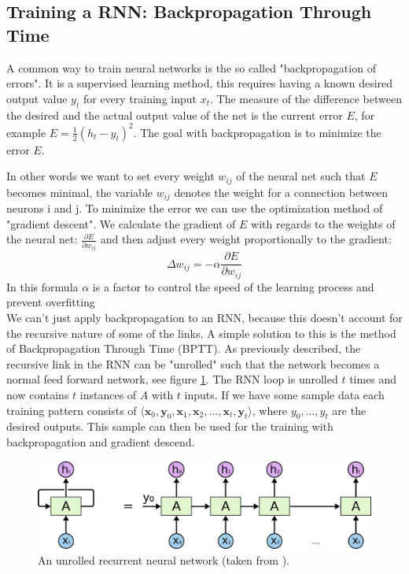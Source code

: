 \subsection{Training a RNN: Backpropagation Through Time}
\label{subsec:BPTT}

A common way to train neural networks is the so called "backpropagation of errors". It is a supervised learning method,
this requires having a known desired output value $y_t$ for every training input $x_t$. 
The measure of the difference between the desired and the 
actual output value of the net is the current error $E$, for example $E = \frac{1}{2} (h_t - y_t)^2$. 
The goal with backpropagation is to minimize the error $E$.

In other words we want to set every weight $w_{ij}$ of the neural net such that $E$ becomes minimal, 
the variable $w_{ij}$ denotes the weight for a connection between neurons i and j.
To minimize the error we can use the optimization method of "gradient descent". 
We calculate the gradient of $E$ with regards to the weights of the neural net: $\frac{\partial E}{\partial w_{ij}}$ and
then adjust every weight proportionally to the gradient:
\[
  \Delta w_{ij} = - \alpha \frac{\partial E}{\partial w_{ij}}
\]
In this formula $\alpha$ is a factor to control the speed of the learning process and prevent overfitting\\

We can't just apply backpropagation to an RNN, because this doesn't account for the recursive nature of some of the links. 
A simple solution to this is the method of Backpropagation Through Time (BPTT). As previously described, the recursive 
link in the RNN can be "unrolled" such that the network becomes a normal feed forward network, see figure \ref{fig:RNN-unrolled}. 
The RNN loop is unrolled $t$ times and now contains $t$ instances of $A$ with $t$ inputs. 
If we have some sample data each training pattern consists of
$\langle\mathbf{x}_0,\mathbf{y}_0,\mathbf{x}_{1},\mathbf{x}_{2},\dots,\mathbf{x}_{t},\mathbf{y}_{t}\rangle$, 
where ${y_0,\dots,y_t}$ are the desired outputs.
This sample can then be used for the training with backpropagation and gradient descend.

\begin{figure}[H]
\begin{center}
  \includegraphics[width=\textwidth]{./img/RNN-unrolled}
  \caption{An unrolled recurrent neural network (taken from \cite{olah:lstm:2015}).}
  \label{fig:RNN-unrolled}
\end{center}
\end{figure}



